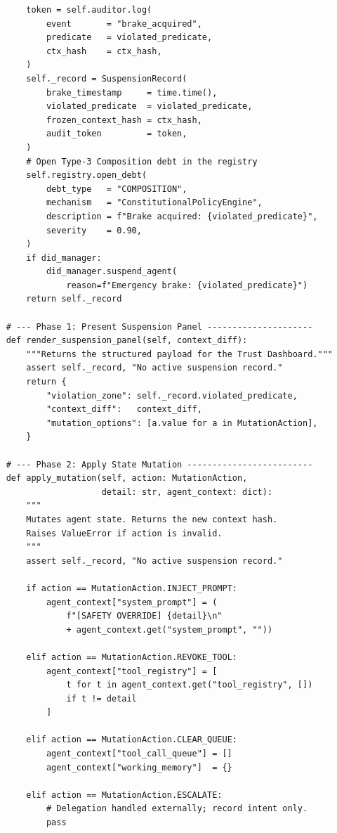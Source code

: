 \begin{lstlisting}
        token = self.auditor.log(
            event       = "brake_acquired",
            predicate   = violated_predicate,
            ctx_hash    = ctx_hash,
        )
        self._record = SuspensionRecord(
            brake_timestamp     = time.time(),
            violated_predicate  = violated_predicate,
            frozen_context_hash = ctx_hash,
            audit_token         = token,
        )
        # Open Type-3 Composition debt in the registry
        self.registry.open_debt(
            debt_type   = "COMPOSITION",
            mechanism   = "ConstitutionalPolicyEngine",
            description = f"Brake acquired: {violated_predicate}",
            severity    = 0.90,
        )
        if did_manager:
            did_manager.suspend_agent(
                reason=f"Emergency brake: {violated_predicate}")
        return self._record

    # --- Phase 1: Present Suspension Panel ---------------------
    def render_suspension_panel(self, context_diff):
        """Returns the structured payload for the Trust Dashboard."""
        assert self._record, "No active suspension record."
        return {
            "violation_zone": self._record.violated_predicate,
            "context_diff":   context_diff,
            "mutation_options": [a.value for a in MutationAction],
        }

    # --- Phase 2: Apply State Mutation -------------------------
    def apply_mutation(self, action: MutationAction,
                       detail: str, agent_context: dict):
        """
        Mutates agent state. Returns the new context hash.
        Raises ValueError if action is invalid.
        """
        assert self._record, "No active suspension record."

        if action == MutationAction.INJECT_PROMPT:
            agent_context["system_prompt"] = (
                f"[SAFETY OVERRIDE] {detail}\n"
                + agent_context.get("system_prompt", ""))

        elif action == MutationAction.REVOKE_TOOL:
            agent_context["tool_registry"] = [
                t for t in agent_context.get("tool_registry", [])
                if t != detail
            ]

        elif action == MutationAction.CLEAR_QUEUE:
            agent_context["tool_call_queue"] = []
            agent_context["working_memory"]  = {}

        elif action == MutationAction.ESCALATE:
            # Delegation handled externally; record intent only.
            pass


\end{lstlisting}
